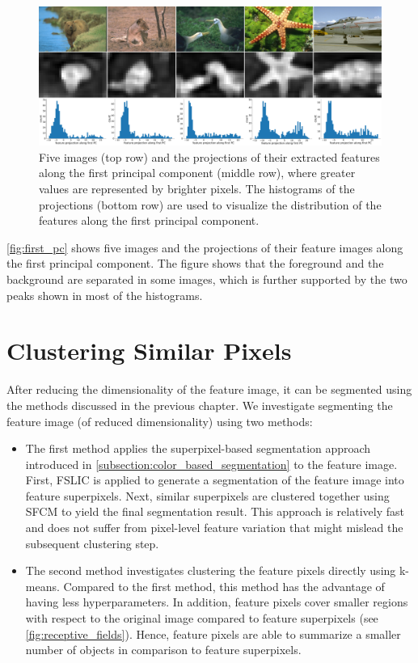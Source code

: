 \begin{figure}[t]
    \centering
    \includegraphics[width=\textwidth]{figures/first_pc.pdf}
    \caption{Five images (top row) and the projections of their extracted features along the first principal component (middle row), where greater values are represented by brighter pixels. The histograms of the projections (bottom row) are used to visualize the distribution of the features along the first principal component.}
    \label{fig:first_pc}
\end{figure}
\autoref{fig:first_pc} shows five images and the projections of their feature images along the first principal component. The figure shows that the foreground and the background are separated in some images, which is further supported by the two peaks shown in most of the histograms.

\section{Clustering Similar Pixels}

After reducing the dimensionality of the feature image, it can be segmented using the methods discussed in the previous chapter. We investigate segmenting the feature image (of reduced dimensionality) using two methods:
\begin{itemize}
    \item The first method applies the superpixel-based segmentation approach introduced in \autoref{subsection:color_based_segmentation} to the feature image. First, FSLIC is applied to generate a segmentation of the feature image into feature superpixels. Next, similar superpixels are clustered together using SFCM to yield the final segmentation result. This approach is relatively fast and does not suffer from pixel-level feature variation that might mislead the subsequent clustering step.
    \item The second method investigates clustering the feature pixels directly using k-means. Compared to the first method, this method has the advantage of having less hyperparameters. In addition, feature pixels cover smaller regions with respect to the original image compared to feature superpixels (see \autoref{fig:receptive_fields}). Hence, feature pixels are able to summarize a smaller number of objects in comparison to feature superpixels.
\end{itemize}

